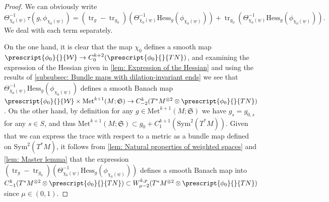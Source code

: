 \documentclass{article}
\numberwithin{equation}{section}        %
\theoremstyle{bfnote}
\theoremstyle{definition}
\theoremstyle{bfremark}
\newcommand{\Met}{\mathrm{Met}}             %
\DeclareMathOperator{\tr}{tr}                   %
\begin{document}
\begin{proof}
    We can obviously write 
    \begin{equation*}
        \Theta_{\chi_{0}(\underline{w})}^{-1} \tau(g,\phi_{\chi_{0}(\underline{w})}) = (\tr_{g}-\tr_{g_0})(\Theta_{\chi_{0}(\underline{w})}^{-1} \mathrm{Hess}_{g}(\phi_{\chi_{0}(\underline{w})})) + \tr_{g_0}(\Theta_{\chi_{0}(\underline{w})}^{-1} \mathrm{Hess}_{g}(\phi_{\chi_{0}(\underline{w})})) .
    \end{equation*}
    We deal with each term separately. 
    
    On the one hand, it is clear that the map $\chi_{0}$ defines a smooth map $\prescript{\phi_0}{}{\mathcal{W}} \to C^{k+2}_0(\prescript{\phi_0}{}{TN})$, and examining the expression of the Hessian given in \cref{lem: Expression of the Hessian} and using the results of \cref{subsubsec: Bundle maps with dilation-invariant ends} we see that $\Theta_{\chi_{0}(\underline{w})}^{-1} \mathrm{Hess}_g(\phi_{\chi_{0}(\underline{w})})$ defines a smooth Banach map $\prescript{\phi_0}{}{\mathcal{W}} \times \Met^{k+1}(M;\mathfrak{S}) \to C^{k}_{-2}(T^*M^{\otimes 2} \otimes \prescript{\phi_0}{}{TN})$. On the other hand, by definition for any $g \in \Met^{k+1}(M;\mathfrak{S})$ we have $g_s = g_{0,s}$ for any $s \in S$, and thus $\Met^{k+1}(M;\mathfrak{S}) \subset g_0 + C^{k+1}_1(\mathrm{Sym}^2(T^*M))$. Given that we can express the trace with respect to a metric as a bundle map defined on $\mathrm{Sym}^2(T^*M)$, it follows from \cref{lem: Natural properties of weighted spaces} and \cref{lem: Master lemma} that the expression $(\tr_{g}-\tr_{g_0})(\Theta_{\chi_{0}(\underline{w})}^{-1} \mathrm{Hess}_{g}(\phi_{\chi_{0}(\underline{w})}))$ defines a smooth Banach map into $C^{k}_{-1}(T^*M^{\otimes 2} \otimes \prescript{\phi_0}{}{TN}) \subset W^{k,p}_{\mu-2}(T^*M^{\otimes 2} \otimes \prescript{\phi_0}{}{TN})$ since $\mu \in (0,1)$.
    

\end{proof}
\end{document}
